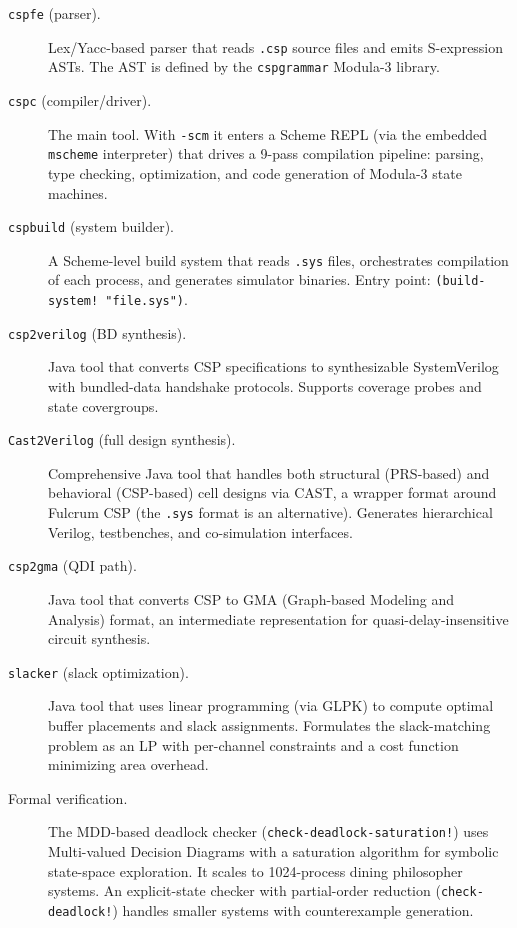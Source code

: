 \documentclass[11pt]{article}
\begin{document}
\begin{description}
\item[\texttt{cspfe} (parser).]
  Lex/Yacc-based parser that reads \texttt{.csp} source files and
  emits S-expression ASTs.  The AST is defined by the
  \texttt{cspgrammar} Modula-3 library.

\item[\texttt{cspc} (compiler/driver).]
  The main tool.  With \texttt{-scm} it enters a Scheme REPL (via the
  embedded \texttt{mscheme} interpreter) that drives a 9-pass
  compilation pipeline: parsing, type checking, optimization, and code
  generation of Modula-3 state machines.

\item[\texttt{cspbuild} (system builder).]
  A Scheme-level build system that reads \texttt{.sys} files,
  orchestrates compilation of each process, and generates simulator
  binaries.  Entry point: \texttt{(build-system!\ "file.sys")}.

\item[\texttt{csp2verilog} (BD synthesis).]
  Java tool that converts CSP specifications to synthesizable
  SystemVerilog with bundled-data handshake protocols.  Supports
  coverage probes and state covergroups.

\item[\texttt{Cast2Verilog} (full design synthesis).]
  Comprehensive Java tool that handles both structural (PRS-based) and
  behavioral (CSP-based) cell designs via CAST, a wrapper format
  around Fulcrum CSP (the \texttt{.sys} format is an alternative).
  Generates hierarchical Verilog, testbenches, and co-simulation
  interfaces.

\item[\texttt{csp2gma} (QDI path).]
  Java tool that converts CSP to GMA (Graph-based Modeling and
  Analysis) format, an intermediate representation for
  quasi-delay-insensitive circuit synthesis.

\item[\texttt{slacker} (slack optimization).]
  Java tool that uses linear programming (via GLPK) to compute optimal
  buffer placements and slack assignments.  Formulates the
  slack-matching problem as an LP with per-channel constraints and a
  cost function minimizing area overhead.

\item[Formal verification.]
  The MDD-based deadlock checker (\texttt{check-deadlock-saturation!})
  uses Multi-valued Decision Diagrams with a saturation algorithm for
  symbolic state-space exploration.  It scales to 1024-process dining
  philosopher systems.  An explicit-state checker with partial-order
  reduction (\texttt{check-deadlock!}) handles smaller systems with
  counterexample generation.
\end{description}
\end{document}
